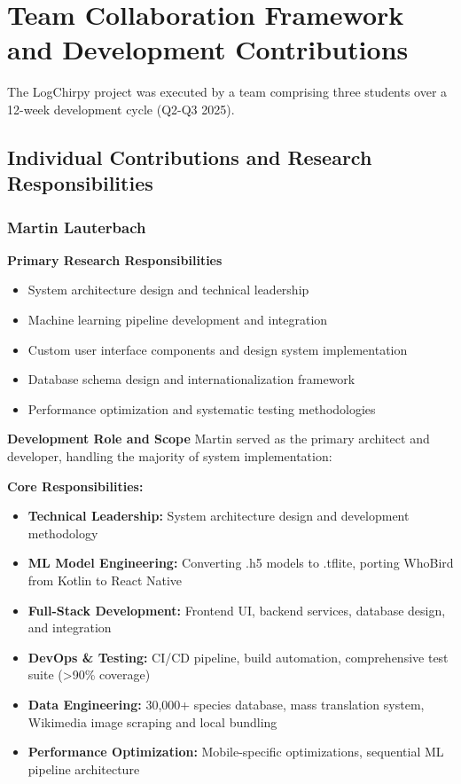 \chapter{Team Collaboration Framework and Development Contributions}

The LogChirpy project was executed by a team comprising three students over a 12-week development cycle (Q2-Q3 2025).

\section{Individual Contributions and Research Responsibilities}

\subsection{Martin Lauterbach}

\textbf{Primary Research Responsibilities}
\begin{itemize}
    \item System architecture design and technical leadership
    \item Machine learning pipeline development and integration
    \item Custom user interface components and design system implementation
    \item Database schema design and internationalization framework
    \item Performance optimization and systematic testing methodologies
\end{itemize}

\textbf{Development Role and Scope}
Martin served as the primary architect and developer, handling the majority of system implementation:

\textbf{Core Responsibilities:}
\begin{itemize}
    \item \textbf{Technical Leadership:} System architecture design and development methodology
    \item \textbf{ML Model Engineering:} Converting .h5 models to .tflite, porting WhoBird from Kotlin to React Native
    \item \textbf{Full-Stack Development:} Frontend UI, backend services, database design, and integration
    \item \textbf{DevOps \& Testing:} CI/CD pipeline, build automation, comprehensive test suite (>90\% coverage)
    \item \textbf{Data Engineering:} 30,000+ species database, mass translation system, Wikimedia image scraping and local bundling
    \item \textbf{Performance Optimization:} Mobile-specific optimizations, sequential ML pipeline architecture
\end{itemize}

